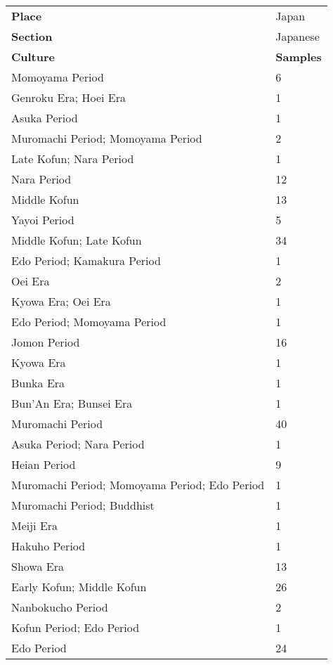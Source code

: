 \documentclass[11pt]{article}
\begin{document}
\begin{table}[t!]
    \centering
    \small
    \begin{tabularx}{\columnwidth}{Xl}
        \hline
        \rowcolor{brown!30} \textbf{Place} & Japan \\
        \rowcolor{brown!20} \textbf{Section} & Japanese \\
        \hline
        \rowcolor{brown!10} \textbf{Culture} & \textbf{Samples} \\
        \hline
        Momoyama Period & 6 \\
        Genroku Era; Hoei Era & 1 \\
        Asuka Period & 1 \\
        Muromachi Period; Momoyama Period & 2 \\
        Late Kofun; Nara Period & 1 \\
        Nara Period & 12 \\
        Middle Kofun & 13 \\
        Yayoi Period & 5 \\
        Middle Kofun; Late Kofun & 34 \\
        Edo Period; Kamakura Period & 1 \\
        Oei Era & 2 \\
        Kyowa Era; Oei Era & 1 \\
        Edo Period; Momoyama Period & 1 \\
        Jomon Period & 16 \\
        Kyowa Era & 1 \\
        Bunka Era & 1 \\
        Bun'An Era; Bunsei Era & 1 \\
        Muromachi Period & 40 \\
        Asuka Period; Nara Period & 1 \\
        Heian Period & 9 \\
        Muromachi Period; Momoyama Period; Edo Period & 1 \\
        Muromachi Period; Buddhist & 1 \\
        Meiji Era & 1 \\
        Hakuho Period & 1 \\
        Showa Era & 13 \\
        Early Kofun; Middle Kofun & 26 \\
        Nanbokucho Period & 2 \\
        Kofun Period; Edo Period & 1 \\
        Edo Period & 24 \\

\end{tabularx}
\end{table}
\end{document}
